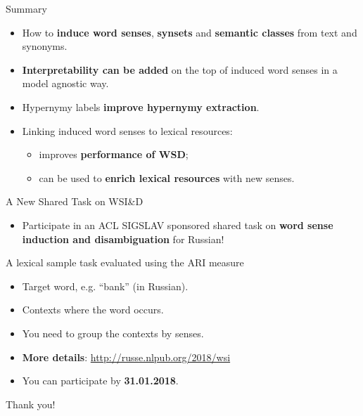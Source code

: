 \documentclass{beamer}
\begin{document}
\begin{frame}{Summary}

\begin{itemize}
	\item How to \textbf{induce word senses}, \textbf{synsets} and \textbf{semantic classes} from text and synonyms.
    \vspace{1em}
    \pause
    
	\item \textbf{Interpretability can be added} on the top of induced word senses in a model agnostic way. 
	\vspace{1em}
    \pause
	
	\item Hypernymy labels \textbf{improve hypernymy extraction}. 
	\vspace{1em}
	\pause
	
	\item Linking induced word senses to lexical resources:
	\begin{itemize} 
		\item improves \textbf{performance of WSD};
		\item can be used to \textbf{enrich lexical resources} with new senses.
	\end{itemize}
	
	
\end{itemize}


\end{frame}


\begin{frame}{A New Shared Task on WSI\&D}
  
  \begin{itemize}
  \item Participate in an ACL SIGSLAV sponsored shared task on \textbf{word sense induction and disambiguation} for Russian!
  
  
 \end{itemize} 
  
  \begin{block}{A lexical sample task evaluated using the ARI measure }
  \begin{itemize}
  	\item Target word, e.g. ``bank'' (in Russian).
  	\item Contexts where the word occurs.
  	\item You need to group the contexts by senses.
  \end{itemize}
   \end{block}
  
  \pause
  \begin{itemize}
    \item \textbf{More details}: \url{http://russe.nlpub.org/2018/wsi}
  \item You can participate by \textbf{31.01.2018}.
     
  \end{itemize}
  
\end{frame}

\begin{frame}{}
\Huge{Thank you!}
\end{frame}



\end{document}
